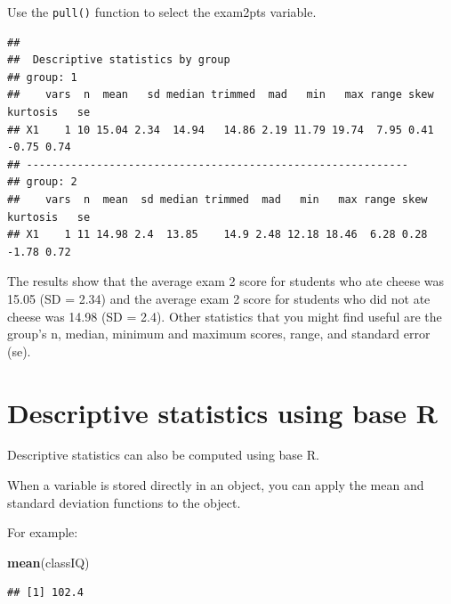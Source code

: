 \documentclass[
]{book}
\newenvironment{Shaded}{\begin{snugshade}}{\end{snugshade}}
\newcommand{\KeywordTok}[1]{\textcolor[rgb]{0.13,0.29,0.53}{\textbf{#1}}}
\newcommand{\NormalTok}[1]{#1}
\newcommand{\OperatorTok}[1]{\textcolor[rgb]{0.81,0.36,0.00}{\textbf{#1}}}
\newcommand{\StringTok}[1]{\textcolor[rgb]{0.31,0.60,0.02}{#1}}
\begin{document}
Use the \texttt{pull()} function to select the exam2pts variable.

\begin{Shaded}
\end{Shaded}

\begin{verbatim}
## 
##  Descriptive statistics by group 
## group: 1
##    vars  n  mean   sd median trimmed  mad   min   max range skew kurtosis   se
## X1    1 10 15.04 2.34  14.94   14.86 2.19 11.79 19.74  7.95 0.41    -0.75 0.74
## ------------------------------------------------------------ 
## group: 2
##    vars  n  mean  sd median trimmed  mad   min   max range skew kurtosis   se
## X1    1 11 14.98 2.4  13.85    14.9 2.48 12.18 18.46  6.28 0.28    -1.78 0.72
\end{verbatim}

The results show that the average exam 2 score for students who ate cheese was 15.05 (SD = 2.34) and the average exam 2 score for students who did not ate cheese was 14.98 (SD = 2.4). Other statistics that you might find useful are the group's n, median, minimum and maximum scores, range, and standard error (se).

\hypertarget{descriptive-statistics-using-base-r}{%
\section{Descriptive statistics using base R}\label{descriptive-statistics-using-base-r}}

Descriptive statistics can also be computed using base R.

When a variable is stored directly in an object, you can apply the mean and standard deviation functions to the object.

For example:

\begin{Shaded}
\begin{Highlighting}[]
\KeywordTok{mean}\NormalTok{(classIQ)}
\end{Highlighting}
\end{Shaded}

\begin{verbatim}
## [1] 102.4
\end{verbatim}
\end{document}
